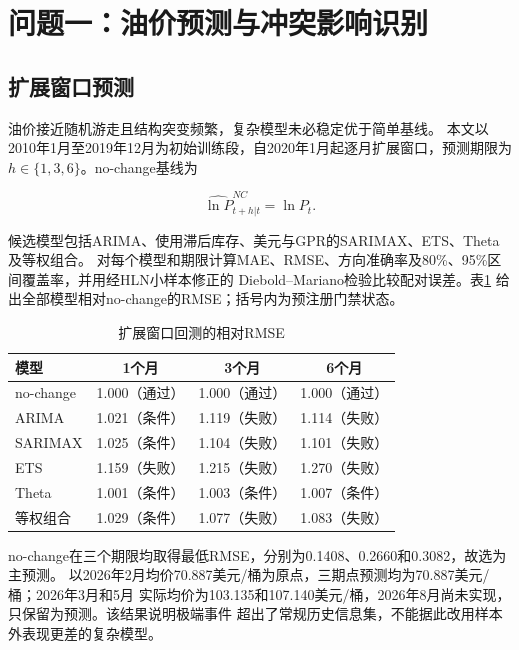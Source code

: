 \section{问题一：油价预测与冲突影响识别}

\subsection{扩展窗口预测}

油价接近随机游走且结构突变频繁，复杂模型未必稳定优于简单基线\cite{baumeister2012,baumeister2015}。
本文以2010年1月至2019年12月为初始训练段，自2020年1月起逐月扩展窗口，预测期限为
$h\in\{1,3,6\}$。no-change基线为

\begin{equation}
  \widehat{\ln P}_{t+h|t}^{NC}=\ln P_t.
  \label{eq:nochange}
\end{equation}

候选模型包括ARIMA、使用滞后库存、美元与GPR的SARIMAX、ETS、Theta及等权组合。
对每个模型和期限计算MAE、RMSE、方向准确率及80\%、95\%区间覆盖率，并用经HLN小样本修正的
Diebold--Mariano检验比较配对误差\cite{diebold1995,harvey1997}。表\ref{tab:q1-backtest}
给出全部模型相对no-change的RMSE；括号内为预注册门禁状态。

\begin{table}[htbp]
  \centering
  \small
  \caption{扩展窗口回测的相对RMSE}
  \label{tab:q1-backtest}
  \begin{tabular}{lccc}
    \toprule
    模型 & 1个月 & 3个月 & 6个月 \\
    \midrule
    no-change & 1.000（通过） & 1.000（通过） & 1.000（通过） \\
    ARIMA & 1.021（条件） & 1.119（失败） & 1.114（失败） \\
    SARIMAX & 1.025（条件） & 1.104（失败） & 1.101（失败） \\
    ETS & 1.159（失败） & 1.215（失败） & 1.270（失败） \\
    Theta & 1.001（条件） & 1.003（条件） & 1.007（条件） \\
    等权组合 & 1.029（条件） & 1.077（失败） & 1.083（失败） \\
    \bottomrule
  \end{tabular}
\end{table}

no-change在三个期限均取得最低RMSE，分别为0.1408、0.2660和0.3082，故选为主预测。
以2026年2月均价70.887美元/桶为原点，三期点预测均为70.887美元/桶；2026年3月和5月
实际均价为103.135和107.140美元/桶，2026年8月尚未实现，只保留为预测。该结果说明极端事件
超出了常规历史信息集，不能据此改用样本外表现更差的复杂模型。

